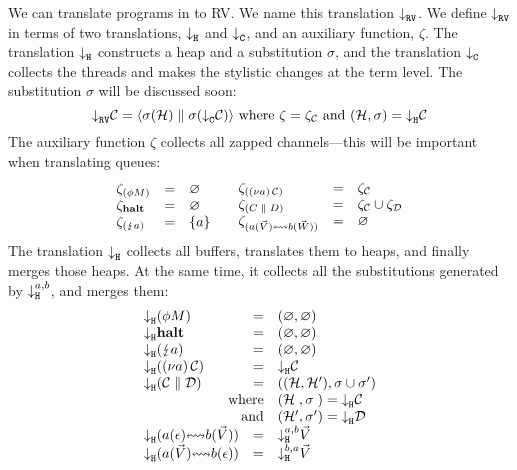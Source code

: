 \documentclass[acmsmall,review,anonymous]{acmart}
\begin{document}
We can translate programs in \affineAGV to RV. We name this translation $\mtr{}$. We define $\mtr{}$ in terms of two translations, $\mtrh{}$ and $\mtrc{}$, and an auxiliary function, $\zeta$. The translation $\mtrh{}$ constructs a heap and a substitution $\sigma$, and the translation $\mtrc{}$ collects the threads and makes the stylistic changes at the term level. The substitution $\sigma$ will be discussed soon:
\[
  \mtr{\gvConf{C}} = \rvRedTup[\sigma(\mtrc{\gvConf{C}})]{\sigma(\rvHeap{H})}{}
  \text{ where }\zeta=\zeta_{\gvConf{C}}\text{ and }(\rvHeap{H},\sigma)=\mtrh{\gvConf{C}}
\]
The auxiliary function $\zeta$ collects all zapped channels---this will be important when translating queues:
\[
  \begin{array}{lcl}
    \zeta_{\parens{\gvThread{\phi}{M}}}
    & = & \varnothing
    \\
    \zeta_{\gvHalt}
    & = & \varnothing
    \\
    \zeta_{\parens{\gvZap{a}}}
    & = & \{a\}
  \end{array}
  \quad
  \begin{array}{lcl}
    \zeta_{\parens{\gvRes{a}{\gvConf{C}}}}
    & = & \zeta_{\gvConf{C}}
    \\
    \zeta_{\parens{\gvPar{C}{D}}}
    & = & \zeta_{\gvConf{C}} \cup \zeta_{\gvConf{D}}
    \\
    \zeta_{\parens{\gvBuf{a}{\gvVec{V}}{b}{\gvVec{W}}}}
    & = & \varnothing
  \end{array}
\]
The translation $\mtrh{}$ collects all buffers, translates them to heaps, and finally merges those heaps. At the same time, it collects all the substitutions generated by $\mtrh[a,b]{}$, and merges them:
\[
  \begin{array}{c}
    \begin{array}{lcl}
      \mtrh{\parens{\gvThread{\phi}{M}}}
      & = & (\varnothing, \varnothing)
      \\
      \mtrh{\gvHalt}
      & = & (\varnothing, \varnothing)
      \\
      \mtrh{\parens{\gvZap{a}}}
      & = & (\varnothing, \varnothing)
      \\
      \mtrh{\parens{\gvRes{a}{\gvConf{C}}}}
      & = & \mtrh{\gvConf{C}}
      \\
      \mtrh{\parens{\gvPar{\gvConf{C}}{\gvConf{D}}}}
      & = & ((\rvHeap{H}\st{,}\,\rvHeap{H'}), \sigma \cup \sigma')
      \\
      \multicolumn{2}{r}{\text{where}}
      & (\rvHeap{H}\hphantom{'}, \sigma\hphantom{'}) = \mtrh{\gvConf{C}}
      \\
      \multicolumn{2}{r}{\text{and}}
      & (\rvHeap{H}', \sigma') = \mtrh{\gvConf{D}}
      \\
      \mtrh{\parens{\gvBuf{a}{\gvVecEmp}{b}{\gvVec{V}}}}
      & = & \mtrh[a,b]{\gvVec{V}}
      \\
      \mtrh{\parens{\gvBuf{a}{\gvVec{V}}{b}{\gvVecEmp}}}
      & = & \mtrh[b,a]{\gvVec{V}}
    \end{array}
  \end{array}
\]
\end{document}
